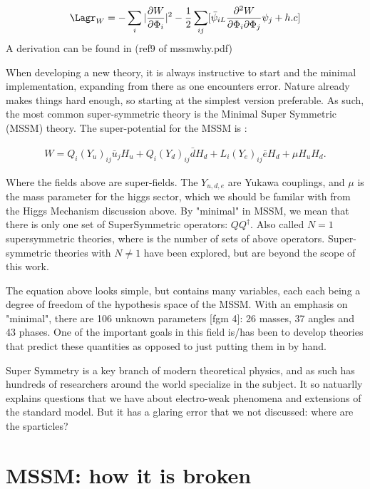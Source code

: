 \begin{equation*}
    \Lagr_W = -\sum_i|\frac{\partial W}{\partial \Phi_i}|^2 -\frac{1}{2}\sum_{ij}[\bar{\psi}_{iL} \frac{\partial^2 W}{\partial \Phi_i \partial \Phi_j}\psi_j + h.c ]
\end{equation*}
A derivation can be found in (ref9 of mssmwhy.pdf)


When developing a new theory, it is always instructive to start and the minimal implementation, expanding from there as one encounters error. Nature already makes things hard enough, so starting at the simplest version preferable. As such, the most common super-symmetric theory is the Minimal Super Symmetric (MSSM) theory. The super-potential for the MSSM is :

\begin{eqnarray}
W= Q_i (Y_u)_{ij} \bar{u}_j H_u+Q_i (Y_d)_{ij} \bar{d} H_d + L_i (Y_e)_{ij} \bar{e} H_d  +\mu H_u H_d. \nonumber
\end{eqnarray}

Where the fields above are super-fields. The $Y_{u,d,e}$ are Yukawa couplings, and $\mu$ is the mass parameter for the higgs sector, which we should be familar with from the Higgs Mechanism discussion above. By "minimal" in MSSM, we mean that there is only one set of SuperSymmetric operators: $Q Q^{\dagger}$. Also called $N=1$ supersymmetric theories, where is the number of sets of above operators. Super-symmetric theories with $N \neq 1$ have been explored, but are beyond the scope of this work. 

The equation above looks simple, but contains many variables, each each being a degree of freedom of the hypothesis space of the MSSM. With an emphasis on "minimal", there are 106 unknown parameters [fgm 4]: 26 masses, 37  angles and 43 phases. One of the important goals in this field is/has been to develop theories that predict these quantities as opposed to just putting them in by hand. 


Super Symmetry is a key branch of modern theoretical physics, and as such has hundreds of researchers around the world specialize in the subject. It so natuarlly explains questions that we have about electro-weak phenomena and extensions of the standard model. But it has a glaring error that we not discussed: where are the sparticles?


\section{MSSM: how it is broken}

